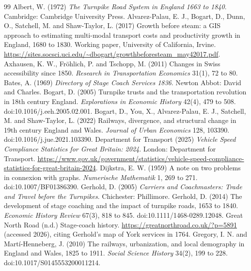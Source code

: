 \documentclass[11pt,a4paper]{article}
\begin{document}
\begin{thebibliography}{99}
 Albert, W. (1972) \textit{The Turnpike Road System in England 1663 to 1840}. Cambridge: Cambridge University Press.
 Alvarez-Palau, E. J., Bogart, D., Dunn, O., Satchell, M. and Shaw-Taylor, L. (2017) Growth before steam: a GIS approach to estimating multi-modal transport costs and productivity growth in England, 1680 to 1830. Working paper, University of California, Irvine. \url{https://sites.socsci.uci.edu/~dbogart/growthbeforesteam_may42017.pdf}.
 Axhausen, K. W., Fr\"ohlich, P. and Tschopp, M. (2011) Changes in Swiss accessibility since 1850. \textit{Research in Transportation Economics} 31(1), 72 to 80.
 Bates, A. (1969) \textit{Directory of Stage Coach Services 1836}. Newton Abbot: David and Charles.
 Bogart, D. (2005) Turnpike trusts and the transportation revolution in 18th century England. \textit{Explorations in Economic History} 42(4), 479 to 508. doi:10.1016/j.eeh.2005.02.001.
 Bogart, D., You, X., Alvarez-Palau, E. J., Satchell, M. and Shaw-Taylor, L. (2022) Railways, divergence, and structural change in 19th century England and Wales. \textit{Journal of Urban Economics} 128, 103390. doi:10.1016/j.jue.2021.103390.
 Department for Transport (2025) \textit{Vehicle Speed Compliance Statistics for Great Britain: 2024}. London: Department for Transport. \url{https://www.gov.uk/government/statistics/vehicle-speed-compliance-statistics-for-great-britain-2024}.
 Dijkstra, E. W. (1959) A note on two problems in connexion with graphs. \textit{Numerische Mathematik} 1, 269 to 271. doi:10.1007/BF01386390.
 Gerhold, D. (2005) \textit{Carriers and Coachmasters: Trade and Travel before the Turnpikes}. Chichester: Phillimore.
 Gerhold, D. (2014) The development of stage coaching and the impact of turnpike roads, 1653 to 1840. \textit{Economic History Review} 67(3), 818 to 845. doi:10.1111/1468-0289.12048.
 Great North Road (n.d.) Stage-coach history. \url{https://greatnorthroad.co.uk/?p=5891} (accessed 2026), citing Gerhold's map of York services in 1764.
 Gregory, I. N. and Mart\'i-Henneberg, J. (2010) The railways, urbanization, and local demography in England and Wales, 1825 to 1911. \textit{Social Science History} 34(2), 199 to 228. doi:10.1017/S0145553200011214.

\end{thebibliography}
\end{document}
